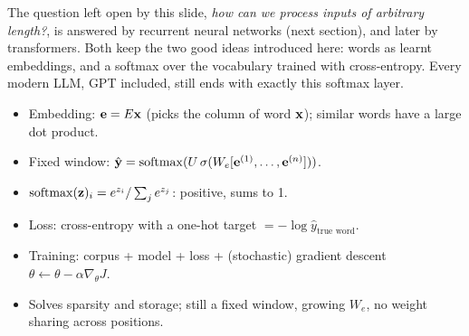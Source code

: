 \begin{nbwhy}
The question left open by this slide, \emph{how can we process inputs of arbitrary
length?}, is answered by recurrent neural networks (next section), and later by
transformers. Both keep the two good ideas introduced here: words as learnt
embeddings, and a softmax over the vocabulary trained with cross-entropy. Every modern
LLM, GPT included, still ends with exactly this softmax layer.
\end{nbwhy}

\begin{nbsummary}
\begin{itemize}[nosep]
  \item Embedding: $\mathbf{e} = E\mathbf{x}$ (picks the column of word $\mathbf{x}$); similar
        words have a large dot product.
  \item Fixed window: $\hat{\mathbf{y}} = \operatorname{softmax}(U\, \sigma(W_e [\mathbf{e}^{(1)}, \ldots,
        \mathbf{e}^{(n)}]))$.
  \item $\operatorname{softmax}(\mathbf{z})_i = e^{z_i} / \sum_j e^{z_j}$: positive, sums to 1.
  \item Loss: cross-entropy with a one-hot target $= -\log \hat y_{\text{true word}}$.
  \item Training: corpus + model + loss + (stochastic) gradient descent
        $\theta \leftarrow \theta - \alpha \nabla_\theta J$.
  \item Solves sparsity and storage; still a fixed window, growing $W_e$, no weight
        sharing across positions.
\end{itemize}
\end{nbsummary}
